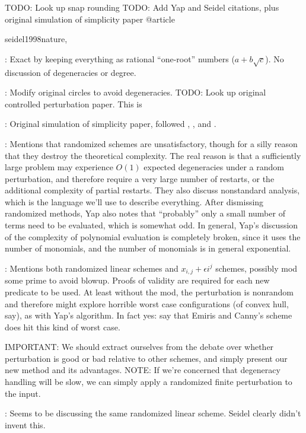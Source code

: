 \documentclass[11pt]{article}
\newcommand{\TODO}{{\color{red} TODO}}
\begin{document}
\TODO: Look up snap rounding
\TODO: Add Yap and Seidel citations, plus original simulation of simplicity paper
@article{seidel1998nature,

\cite{wein2006circles}: Exact by keeping everything as rational ``one-root'' numbers ($a + b \sqrt{c}$).  No discussion of degeneracies or degree.

\cite{halperin2004controlled}: Modify original circles to avoid degeneracies.  \TODO: Look up original controlled perturbation paper.  This is 

\cite{edelsbrunner1990simulation}: Original simulation of simplicity paper, followed \cite{yap1990symbolic}, \cite{emiris1992efficient}, and \cite{emiris1995general}.

\cite{yap1990symbolic}: Mentions that randomized schemes are unsatisfactory, though for a silly reason that they destroy the theoretical complexity.  The real reason is that a sufficiently
large problem may experience $O(1)$ expected degeneracies under a random perturbation, and therefore require a very large number of restarts, or the additional complexity of partial restarts.
They also discuss nonstandard analysis, which is the language we'll use to describe everything.  After dismissing randomized methods, Yap also notes that ``probably'' only a small number of
terms need to be evaluated, which is somewhat odd.  In general, Yap's discussion of the complexity of polynomial evaluation is completely broken, since it uses the number of monomials,
and the number of monomials is in general exponential.

\cite{emiris1992efficient}: Mentions both randomized linear schemes and $x_{i,j} + \epsilon i^j$ schemes, possibly mod some prime to avoid blowup.  Proofs of validity are required for
each new predicate to be used.  At least without the mod, the perturbation is nonrandom and therefore might explore horrible worst case configurations (of convex hull, say), as with Yap's
algorithm.  In fact yes: \cite{burnikel1994degeneracy} say that Emiris and Canny's scheme does hit this kind of worst case.

IMPORTANT: We should extract ourselves from the debate over whether perturbation is good or bad relative to other schemes, and simply present our new method and its advantages.
NOTE: If we're concerned that degeneracy handling will be slow, we can simply apply a randomized finite perturbation to the input.

\cite{emiris1995general}: Seems to be discussing the same randomized linear scheme.  Seidel clearly didn't invent this.

}
\end{document}
